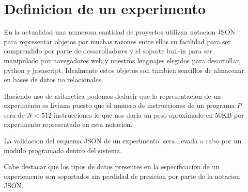 \section{Definicion de un experimento}

En la actualidad una numerosa cantidad de proyectos utilizan notacion JSON para representar
objetos por muchas razones entre ellas su facilidad para ser comprendido por parte de desarrolladores
y el soporte buil-in para ser manipulado por navegadores web y nuestros lenguajes elegidos para
desarrollar, python y javascript. Idealmente estos objetos son tambien sencillos de almacenar en 
bases de datos no relacionales.

Haciendo uso de aritmetica podemos deducir que la representacion de un experimento
es liviana puesto que el numero de instrucciones de un programa \(P\) sera de \(N < 512 \) instrucciones
lo que nos daria un peso aproximado en 50KB por experimento representado en esta notacion.

La validacion del esquema JSON de un experimento, sera llevada a cabo por un modulo programado
dentro del sistema. 

Cabe destacar que los tipos de datos presentes en la especificacion de un experiemento son
soportados sin perdidad de presicion por parte de la notacion JSON.\cite{json_ref}








\newpage

